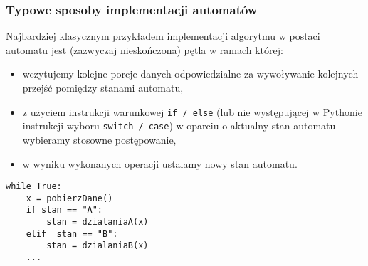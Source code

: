 \documentclass{pdfBooklets}
\begin{document}
\subsubsection{Typowe sposoby implementacji automatów}


Najbardziej klasycznym przykładem implementacji algorytmu w postaci automatu jest (zazwyczaj nieskończona) pętla w ramach której:

\noindent\begin{minipage}[t]{0.61\textwidth}
\begin{itemize}
\item wczytujemy kolejne porcje danych odpowiedzialne za wywoływanie kolejnych przejść pomiędzy stanami automatu,
\item z użyciem instrukcji warunkowej {\tt if / else} (lub nie występującej w Pythonie instrukcji wyboru {\tt switch / case}) w oparciu o aktualny stan automatu wybieramy stosowne postępowanie,
\item w wyniku wykonanych operacji ustalamy nowy stan automatu.
\end{itemize}
\end{minipage}\hfill\begin{minipage}[t]{0.35\textwidth}
\vspace{-8pt}
\begin{verbatim}
while True:
    x = pobierzDane()
    if stan == "A":
        stan = dzialaniaA(x)
    elif  stan == "B":
        stan = dzialaniaB(x)
    ...
\end{verbatim}
\end{minipage}

\end{document}
